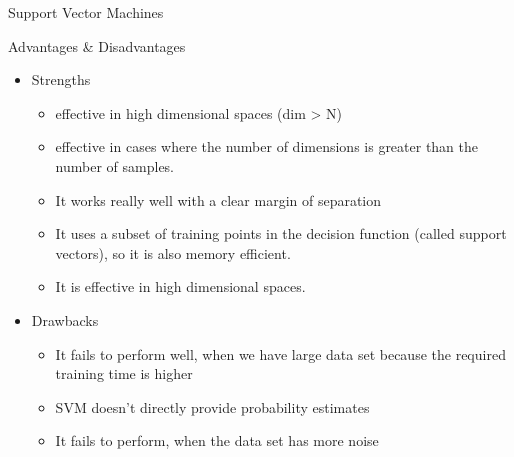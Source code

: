 \documentclass[ignorenonframetext,]{beamer}
\providecommand{\tightlist}{%
  \setlength{\itemsep}{0pt}\setlength{\parskip}{0pt}}
\begin{document}
\begin{frame}{Support Vector Machines}

\begin{block}{Advantages \& Disadvantages}

\begin{itemize}
\tightlist
\item
  Strengths

  \begin{itemize}
  \tightlist
  \item
    effective in high dimensional spaces (dim \textgreater{} N)
  \item
    effective in cases where the number of dimensions is greater than
    the number of samples.
  \item
    It works really well with a clear margin of separation
  \item
    It uses a subset of training points in the decision function (called
    support vectors), so it is also memory efficient.
  \item
    It is effective in high dimensional spaces.
  \end{itemize}
\item
  Drawbacks

  \begin{itemize}
  \tightlist
  \item
    It fails to perform well, when we have large data set because the
    required training time is higher
  \item
    SVM doesn't directly provide probability estimates
  \item
    It fails to perform, when the data set has more noise
  \end{itemize}
\end{itemize}

\end{block}

\end{frame}
\end{document}

